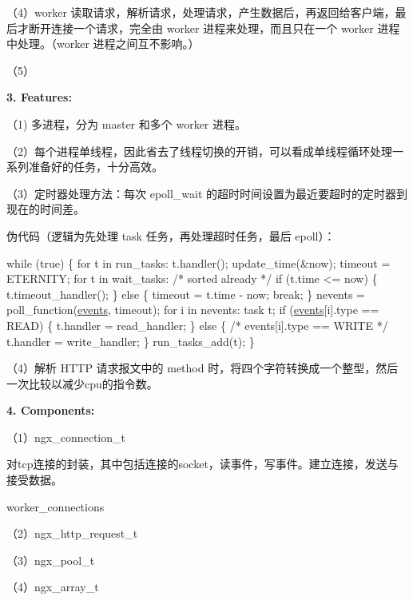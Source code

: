 （4）worker 读取请求，解析请求，处理请求，产生数据后，再返回给客户端，最后才断开连接一个请求，完全由 worker 进程来处理，而且只在一个 worker 进程中处理。（worker 进程之间互不影响。）

（5）

{\bfseries 3. Features\+:}

（1) 多进程，分为 master 和多个 worker 进程。

（2）每个进程单线程，因此省去了线程切换的开销，可以看成单线程循环处理一系列准备好的任务，十分高效。

（3）定时器处理方法：每次 epoll\+\_\+wait 的超时时间设置为最近要超时的定时器到现在的时间差。

伪代码（逻辑为先处理 task 任务，再处理超时任务，最后 epoll）： 
\begin{DoxyCode}
\textcolor{keywordflow}{while} (\textcolor{keyword}{true}) \{
    \textcolor{keywordflow}{for} t in run\_tasks:
        t.handler();
    update\_time(&now);
    timeout = ETERNITY;
    \textcolor{keywordflow}{for} t in wait\_tasks: \textcolor{comment}{/* sorted already */}
        \textcolor{keywordflow}{if} (t.time <= now) \{
            t.timeout\_handler();
        \} \textcolor{keywordflow}{else} \{
            timeout = t.time - now;
            \textcolor{keywordflow}{break};
        \}
    nevents = poll\_function(\hyperlink{pink__epoll_8cpp_a18bcd14e4d4cab5184d3b046754cd248}{events}, timeout);
    \textcolor{keywordflow}{for} i in nevents:
        task t;
        \textcolor{keywordflow}{if} (\hyperlink{pink__epoll_8cpp_a18bcd14e4d4cab5184d3b046754cd248}{events}[i].type == READ) \{
            t.handler = read\_handler;
        \} \textcolor{keywordflow}{else} \{ \textcolor{comment}{/* events[i].type == WRITE */}
            t.handler = write\_handler;
        \}
        run\_tasks\_add(t);
\}
\end{DoxyCode}


（4）解析 H\+T\+TP 请求报文中的 method 时，将四个字符转换成一个整型，然后一次比较以减少cpu的指令数。

{\bfseries 4. Components\+:}

（1）ngx\+\_\+connection\+\_\+t

对tcp连接的封装，其中包括连接的socket，读事件，写事件。建立连接，发送与接受数据。

worker\+\_\+connections

（2）ngx\+\_\+http\+\_\+request\+\_\+t

（3）ngx\+\_\+pool\+\_\+t

（4）ngx\+\_\+array\+\_\+t

